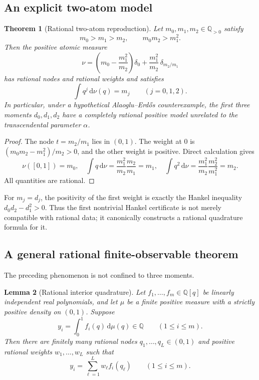 \documentclass[11pt,oneside]{article}
\newtheorem{theorem}{Theorem}[section]
\newtheorem{lemma}[theorem]{Lemma}
\theoremstyle{definition}
\theoremstyle{remark}
\newcommand{\Q}{\mathbb Q}
\newcommand{\dd}{\,\mathrm d}
\newcommand{\AEname}{Alaoglu--Erd\H{o}s}
\begin{document}
\subsection{An explicit two-atom model}

\begin{theorem}[Rational two-atom reproduction]\label{thm:two-atom}
Let $m_0,m_1,m_2\in\Q_{>0}$ satisfy
\[
 m_0>m_1>m_2,
 \qquad m_0m_2>m_1^2.
\]
Then the positive atomic measure
\begin{equation}\label{eq:two-atom-measure}
 \nu=
 \left(m_0-\frac{m_1^2}{m_2}\right)\delta_0
 +\frac{m_1^2}{m_2}\,\delta_{m_2/m_1}
\end{equation}
has rational nodes and rational weights and satisfies
\begin{equation}\label{eq:two-atom-moments}
 \int q^j\dd\nu(q)=m_j
 \qquad(j=0,1,2).
\end{equation}
In particular, under a hypothetical \AEname{} counterexample, the first three moments
$d_0,d_1,d_2$ have a completely rational positive model unrelated to the transcendental
parameter $\alpha$.
\end{theorem}

\begin{proof}
The node $t=m_2/m_1$ lies in $(0,1)$.  The weight at $0$ is
$(m_0m_2-m_1^2)/m_2>0$, and the other weight is positive.  Direct calculation gives
\[
 \nu([0,1])=m_0,
 \quad
 \int q\dd\nu=\frac{m_1^2}{m_2}\frac{m_2}{m_1}=m_1,
 \quad
 \int q^2\dd\nu=\frac{m_1^2}{m_2}\frac{m_2^2}{m_1^2}=m_2.
\]
All quantities are rational.
\end{proof}

For $m_j=d_j$, the positivity of the first weight is exactly the Hankel inequality
$d_0d_2-d_1^2>0$.  Thus the first nontrivial Hankel certificate is not merely compatible with
rational data; it canonically constructs a rational quadrature formula for it.

\subsection{A general rational finite-observable theorem}

The preceding phenomenon is not confined to three moments.

\begin{lemma}[Rational interior quadrature]\label{lem:rational-quadrature}
Let $f_1,\ldots,f_m\in\Q[q]$ be linearly independent real polynomials, and let $\mu$ be a
finite positive measure with a strictly positive density on $(0,1)$.  Suppose
\[
 y_i=\int_0^1 f_i(q)\dd\mu(q)\in\Q
 \qquad(1\le i\le m).
\]
Then there are finitely many rational nodes $q_1,\ldots,q_L\in(0,1)$ and positive rational
weights $w_1,\ldots,w_L$ such that
\begin{equation}\label{eq:rational-quadrature-general}
 y_i=\sum_{\ell=1}^Lw_\ell f_i(q_\ell)
 \qquad(1\le i\le m).
\end{equation}
\end{lemma}
\end{document}
